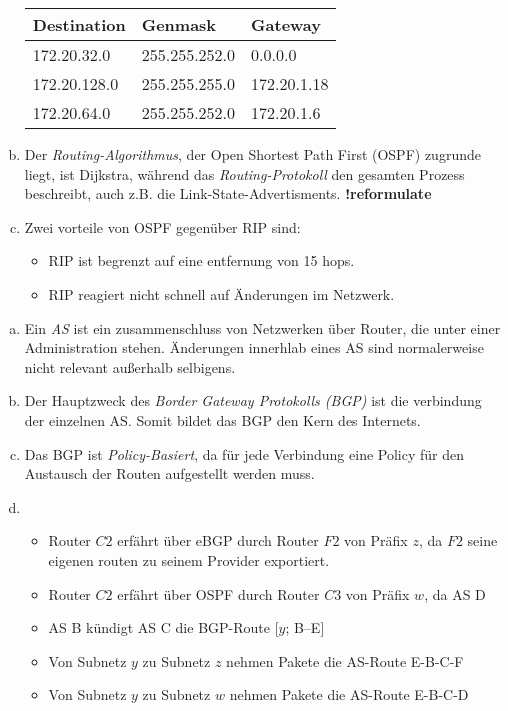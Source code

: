 \begin{enumerate}[a)]
	\begin{center}\begin{tabular}{l|l|l}
		Destination  & Genmask       & Gateway     \\ \hline
		172.20.32.0  & 255.255.252.0 & 0.0.0.0     \\
		172.20.128.0 & 255.255.255.0 & 172.20.1.18 \\
		172.20.64.0  & 255.255.252.0 & 172.20.1.6  
	\end{tabular}\end{center}
	\item Der \emph{Routing-Algorithmus}, der Open Shortest Path First (OSPF) zugrunde liegt, 
	ist Dijkstra, während das \emph{Routing-Protokoll} den gesamten Prozess beschreibt, auch 
	z.B. die Link-State-Advertisments. \textbf{!reformulate}
	\item Zwei vorteile von OSPF gegenüber RIP sind: \begin{itemize}
		\item RIP ist begrenzt auf eine entfernung von 15 hops.
		\item RIP reagiert nicht schnell auf Änderungen im Netzwerk.
	\end{itemize}
\end{enumerate}

\begin{enumerate}[a)]
	\item Ein \emph{AS} ist ein zusammenschluss von Netzwerken über Router, die unter einer Administration stehen. Änderungen innerhlab eines AS sind normalerweise nicht relevant außerhalb selbigens.
	\item Der Hauptzweck des  \emph{Border Gateway Protokolls (BGP)} ist die verbindung der einzelnen AS. Somit bildet das BGP den Kern des Internets.
	\item Das BGP ist \emph{Policy-Basiert}, da für jede Verbindung eine Policy für den Austausch der Routen aufgestellt werden muss.
	\item \begin{itemize}
		\item Router $C2$ erfährt über eBGP durch Router $F2$ von Präfix $z$, da $F2$ seine eigenen routen zu seinem Provider exportiert.
		\item Router $C2$ erfährt über OSPF durch Router $C3$ von Präfix $w$, da AS D 
		\item AS B kündigt AS C die BGP-Route [$y$; B–E]
		\item Von Subnetz $y$ zu Subnetz $z$ nehmen Pakete die AS-Route E-B-C-F
		\item Von Subnetz $y$ zu Subnetz $w$ nehmen Pakete die AS-Route E-B-C-D 
	\end{itemize}
\end{enumerate}

